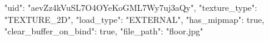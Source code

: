 {
    "uid": "aevZz4kVuSL7O4OYeKoGML7Wy7uj3aQy",
    "texture_type": "TEXTURE_2D",
    "load_type": "EXTERNAL",
    "has_mipmap": true,
    "clear_buffer_on_bind": true,
    "file_path": "floor.jpg"
}